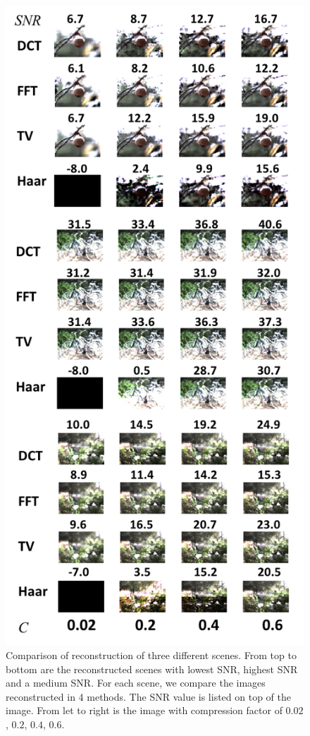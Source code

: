 \documentclass[10pt,twocolumn,letterpaper]{article}
\begin{document}
\begin{figure}[t]
\begin{center}
 \includegraphics[width=0.95\linewidth]{img/example_images.png}
\end{center}
   \caption{Comparison of reconstruction of three different scenes. From top to bottom are the reconstructed scenes with lowest SNR, highest SNR and a medium SNR. For each scene, we compare the images reconstructed  in 4 methods.  The SNR value is listed on top of the image. From let to right is the image with compression factor of $0.02$, $0.2$, $0.4$, $0.6$.}
\end{figure}
\end{document}
